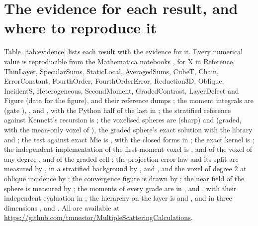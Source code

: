 \documentclass[preprint,review,12pt]{elsarticle}
\begin{document}
\FloatBarrier

\section{The evidence for each result, and where to reproduce it}\label{app:evidence}

Table~\ref{tab:evidence} lists each result with the evidence for it. Every numerical value is reproducible from the Mathematica notebooks
, for X in Reference, ThinLayer, SpecularSums,
StaticLocal, AveragedSums, CubeT, Chain, ErrorConstant, FourthOrder, FourthOrderError, Reduction3D,
Oblique, IncidentS, Heterogeneous, SecondMoment, GradedContrast, LayerDefect and Figure (data for the figure), and their reference dumps
; the moment integrals are
 (gate ), ,
 and , with the Python half of the last in
; the stratified reference against Kennett's recursion is
; the voxelised spheres are
 (sharp) and  (graded, with the mean-only voxel of ), the graded sphere's exact solution
 with the library 
and ;
the test against exact Mie is
, with the closed forms in ; the exact kernel is
; the independent implementation of the
first-moment voxel is , and of the voxel of any
degree , and of the graded cell
; the projection-error law and its split are measured by
, in a stratified background by
,
 and , and the voxel of degree $2$ at oblique incidence by
; the convergence figure is drawn by
; the near field of the sphere is measured by
; the moments of every grade are in
,  and
, with their independent evaluation in
; the hierarchy on the layer is
 and ,
and in three dimensions ,
 and
. All are available at
\url{https://github.com/tmnestor/MultipleScatteringCalculations}.
\end{document}
